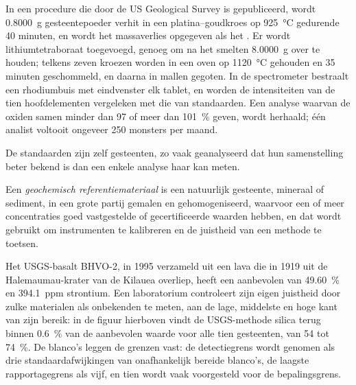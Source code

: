 \begin{inthelab}
In een procedure die door de US Geological Survey is gepubliceerd, wordt \qty{0.8000}{g} gesteentepoeder verhit in een
platina--goudkroes op \qty{925}{\celsius} gedurende 40 minuten, en wordt het massaverlies opgegeven als
het . Er wordt lithiumtetraboraat toegevoegd, genoeg om na het smelten \qty{8.0000}{g} over te houden;
telkens zeven kroezen worden in een oven op \qty{1120}{\celsius} gehouden en 35 minuten geschommeld,
en daarna in mallen gegoten. In de spectrometer bestraalt een rhodiumbuis met eindvenster elk tablet, en
worden de intensiteiten van de tien hoofdelementen vergeleken met die van standaarden. Een analyse waarvan de
oxiden samen minder dan 97 of meer dan \qty{101}{\percent} geven, wordt herhaald; één analist voltooit
ongeveer 250 monsters per maand.
\end{inthelab}

De standaarden zijn zelf gesteenten, zo vaak geanalyseerd dat hun samenstelling beter bekend is dan
een enkele analyse haar kan meten.

\begin{definition}\label{def:b2:field-lab-methods-2:rm}
Een \emph{geochemisch referentiemateriaal} is een natuurlijk gesteente,
mineraal of sediment, in een grote partij gemalen en gehomogeniseerd, waarvoor een of meer concentraties
goed vastgestelde of gecertificeerde waarden hebben, en dat wordt gebruikt om instrumenten te kalibreren en de juistheid
van een methode te toetsen.
\end{definition}

Het USGS-basalt BHVO-2, in 1995 verzameld uit een lava die in 1919 uit de Halemaumau-krater van de
Kilauea overliep, heeft een aanbevolen  van \qty{49.60}{\percent} en \qty{394.1}{ppm}
strontium. Een laboratorium controleert zijn eigen juistheid door zulke materialen als onbekenden te meten, aan de lage,
middelste en hoge kant van zijn bereik: in de figuur hierboven vindt de USGS-methode silica terug binnen
\qty{0.6}{\percent} van de aanbevolen waarde voor alle tien gesteenten, van  54 tot
\qty{74}{\percent}. De blanco's leggen de grenzen vast: de detectiegrens wordt genomen als drie
standaardafwijkingen van onafhankelijk bereide blanco's, de laagste rapportagegrens als vijf, en tien wordt vaak
voorgesteld voor de bepalingsgrens.

